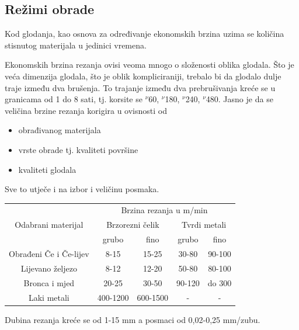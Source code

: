 \documentclass[a4paper,12pt]{article}
\numberwithin{figure}{section}
\begin{document}
\subsection{Režimi obrade}
Kod glodanja, kao osnova za određivanje ekonomskih brzina uzima se količina stisnutog materijala u jedinici vremena.\par
Ekonomskih brzina rezanja ovisi veoma mnogo o složenosti oblika glodala. Što je veća dimenzija glodala, što je oblik kompliciraniji, trebalo bi da glodalo dulje traje između dva brušenja. To trajanje između dva prebrušivanja kreće se u granicama od 1 do 8 sati, tj. korsite se $^{\nu}$60, $^{\nu}$180, $^{\nu}$240, $^{\nu}$480.
Jasno je da se veličina brzine rezanja korigira u ovisnosti od 
\begin{itemize}
\item obrađivanog materijala
\item vrste obrade tj. kvaliteti površine
\item kvaliteti glodala
\end{itemize}
Sve to utječe i na izbor i veličinu posmaka.
\begin{table}[!h]
\centering
\begin{tabular}{|c|c|c|c|c|}
\hline
\multirow{3}{*}{Odabrani materijal} & \multicolumn{4}{c|}{Brzina rezanja u m/min}                              \\ \cline{2-5} 
                                    & \multicolumn{2}{c|}{Brzorezni čelik} & \multicolumn{2}{c|}{Tvrdi metali} \\ \cline{2-5} 
                                    & grubo             & fino             & grubo           & fino            \\ \hline
Obrađeni Če i Če-lijev              & 8-15              & 15-25            & 30-80           & 90-100          \\ \hline
Lijevano željezo                    & 8-12              & 12-20            & 50-80           & 80-100          \\ \hline
Bronca i mjed                       & 20-25             & 30-50            & 90-120          & do 300          \\ \hline
Laki metali                         & 400-1200          & 600-1500         & -               & -               \\ \hline
\end{tabular}
\end{table}
\FloatBarrier
Dubina rezanja kreće se od 1-15 mm a posmaci od 0,02-0,25 mm/zubu.
\end{document}
